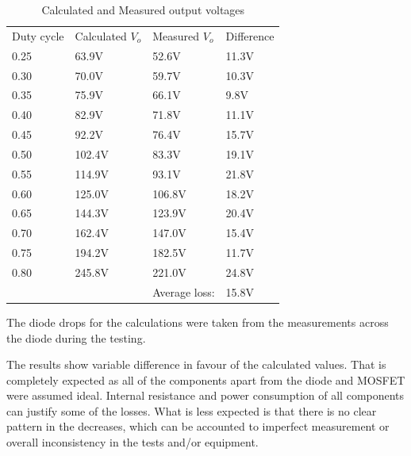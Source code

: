 \begin{table}[H]
\begin{center}
\caption {Calculated and Measured output voltages} \label{tab:V_OUT_ALL} 
\vspace{-1mm}
\begin{tabular}{|l|l|l|l|}
\cline{1-4}
Duty cycle & Calculated $V_o$ & Measured $V_o$& Difference \\ \cline{1-4}
0.25&	63.9V & 52.6V & 11.3V \\ \cline{1-4}
0.30&	70.0V & 59.7V & 10.3V \\ \cline{1-4}
0.35&	75.9V & 66.1V & 9.8V \\ \cline{1-4}
0.40&	82.9V & 71.8V & 11.1V \\ \cline{1-4}
0.45&	92.2V & 76.4V & 15.7V \\ \cline{1-4}
0.50&	102.4V & 83.3V & 19.1V \\ \cline{1-4}
0.55&	114.9V & 93.1V & 21.8V \\ \cline{1-4}
0.60&	125.0V & 106.8V & 18.2V\\ \cline{1-4}
0.65&	144.3V & 123.9V & 20.4V \\ \cline{1-4}
0.70&	162.4V & 147.0V & 15.4V\\ \cline{1-4}
0.75&	194.2V & 182.5V & 11.7V \\ \cline{1-4}
0.80&	245.8V & 221.0V & 24.8V\\ \cline{1-4}
&	 & Average loss:  & 15.8V \\ \cline{1-4}
\end{tabular}
\end{center}
\end{table}

The diode drops for the calculations were taken from the measurements across the diode during the testing.

The results show variable difference in favour of the calculated values. That is completely expected as all of the components apart from the diode and MOSFET were assumed ideal. Internal resistance and power consumption of all components can justify some of the losses. What is less expected is that there is no clear pattern in the decreases, which can be accounted to imperfect measurement or overall inconsistency in the tests and/or equipment. 

